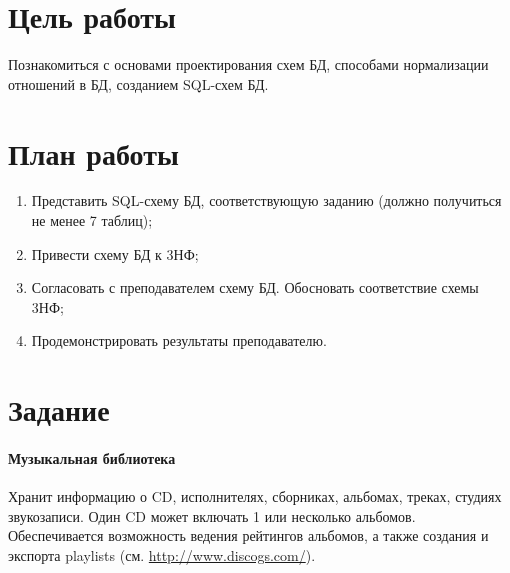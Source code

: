 \section{Цель работы}

Познакомиться с основами проектирования схем БД, способами нормализации отношений в БД, созданием SQL-схем БД.

\section{План работы}

\begin{enumerate}
	\item Представить SQL-схему БД, соответствующую заданию (должно получиться не менее 7 таблиц);
	\item Привести схему БД к 3НФ;
	\item Согласовать с преподавателем схему БД. Обосновать соответствие схемы 3НФ;
	\item Продемонстрировать результаты преподавателю.
\end{enumerate}

\section{Задание}

\paragraph{Музыкальная библиотека}

Хранит информацию о CD, исполнителях, сборниках, альбомах, треках, студиях звукозаписи. Один CD может включать 1 или несколько альбомов. Обеспечивается возможность ведения рейтингов альбомов, а также создания и экспорта playlists (см. \url{http://www.discogs.com/}).